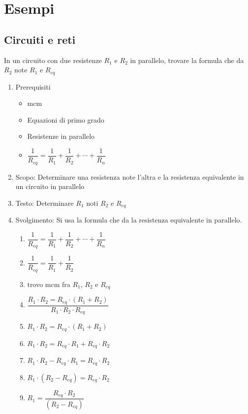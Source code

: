 \chapter{Esempi}
	\section{Circuiti e reti}
	\label{sec:CircuitieReti}
	\begin{table}[H]
		\caption{In un circuito con due resistenze $R_1$ e $R_2$ in parallelo, trovare la formula che da $R_2$ note $R_1$ e $R_{eq}$}
		\label{tab:Trovarediffangoli}
		\begin{enumerate}
			\item Prerequisiti 
			\begin{itemize}
				\item mcm
				\item Equazioni di primo grado
				\item Resistenze in parallelo
				\item $\dfrac{1}{R_{eq}}=\dfrac{1}{R_1}+\dfrac{1}{R_2}+\cdots+\dfrac{1}{R_n}$			
			\end{itemize}
			\item Scopo: Determinare una resistenza note l'altra e la resistenza equivalente in un circuito in parallelo
			\item Testo: Determinare $R_1$ noti $R_2$ e $R_{eq}$
			\item Svolgimento: Si usa la formula che da la resistenza equivalente in parallelo.
			\begin{enumerate}
				\item $\dfrac{1}{R_{eq}}=\dfrac{1}{R_1}+\dfrac{1}{R_2}+\cdots+\dfrac{1}{R_n}$
				\item $\dfrac{1}{R_{eq}}=\dfrac{1}{R_1}+\dfrac{1}{R_2}$
				\item trovo mcm fra $R_1$, $R_2$ e $R_{eq}$
				\item $\dfrac{R_1\cdot R_2=R_{eq}\cdot (R_1+R_2)}{R_1\cdot R_2\cdot R_{eq}}$
				\item $R_1\cdot R_2=R_{eq}\cdot (R_1+R_2)$
				\item $R_1\cdot R_2=R_{eq}\cdot R_1+R_{eq}\cdot R_2$
				\item $R_1\cdot R_2-R_{eq}\cdot R_1=R_{eq}\cdot R_2$
				\item $R_1\cdot (R_2-R_{eq})=R_{eq}\cdot R_2$
				\item $R_1=\dfrac{R_{eq}\cdot R_2}{(R_2-R_{eq})}$
			\end{enumerate}
		\end{enumerate}
	\end{table}
